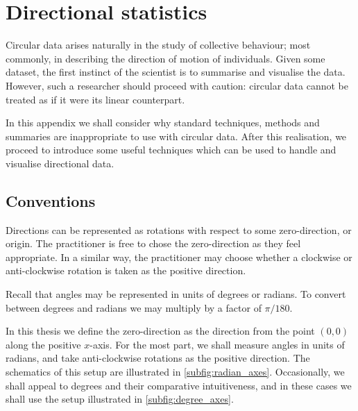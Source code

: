 \graphicspath{{fig/circ_stats_intro/}}

\chapter{Directional statistics}	
\label{cha:direct_stats}

Circular data arises naturally in the study of collective behaviour; most commonly, in
describing the direction of motion of individuals. Given some dataset, the first
instinct of the scientist is to summarise and visualise the data. However, such a
researcher should proceed with caution: circular data cannot be treated as if it were
its linear counterpart.

In this appendix we shall consider why standard techniques, methods and summaries are
inappropriate to use with circular data. After this realisation, we proceed to introduce
some useful techniques which can be used to handle and visualise directional data.

\section{Conventions}
\label{sec:conventions}

Directions can be represented as rotations with respect to some zero-direction, or
origin. The practitioner is free to chose the zero-direction as they feel appropriate. In
a similar way, the practitioner may choose whether a clockwise or anti-clockwise rotation
is taken as the positive direction.

Recall that angles may be represented in units of degrees or radians. To convert between
degrees and radians we may multiply by a factor of $\pi/180$\textdegree.

In this thesis we define the zero-direction as the direction from the point $(0, 0)$ along
the positive $x$-axis. For the most part, we shall measure angles in units of radians, and
take anti-clockwise rotations as the positive direction. The schematics of this setup are
illustrated in \cref{subfig:radian_axes}. Occasionally, we shall appeal to degrees and
their comparative intuitiveness, and in these cases we shall use the setup illustrated in
\cref{subfig:degree_axes}.

